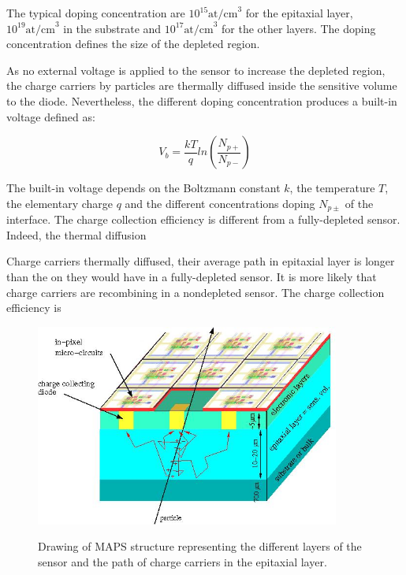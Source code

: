     The typical doping concentration are $10^{15} \text{at/cm}^3$ for the epitaxial layer, $10^{19} \text{at/cm}^3$ in the substrate and $10^{17} \text{at/cm}^3$ for the other layers.
    The doping concentration defines the size of the depleted region.

    As no external voltage is applied to the sensor to increase the depleted region, the charge carriers by particles are thermally diffused inside the sensitive volume to the diode.
    Nevertheless, the different doping concentration produces a built-in voltage defined as: 

    \begin{equation}
      V_b = \frac{kT}{q}ln\left( \frac{N_{p+}}{N_{p-}}\right)
    \end{equation}
    
    The built-in voltage depends on the Boltzmann constant $k$, the temperature $T$, the elementary charge $q$ and the different concentrations doping $N_{p\pm}$ of the interface.
    The charge collection efficiency is different from a fully-depleted sensor. 
    Indeed, the thermal diffusion 

    Charge carriers thermally diffused, their average path in epitaxial layer is longer than the on they would have in a fully-depleted sensor.
    It is more likely that charge carriers are recombining in a nondepleted sensor. 
    The charge collection efficiency is 

    \begin{figure}[!h]
      \centering
      \includegraphics[width = 10cm]{Pictures/vxd/principeMapsMIP.jpg}
      \label{fig:principleMaps}
      \caption{Drawing of MAPS structure representing the different layers of the sensor and the path of charge carriers in the epitaxial layer.}
    \end{figure}

